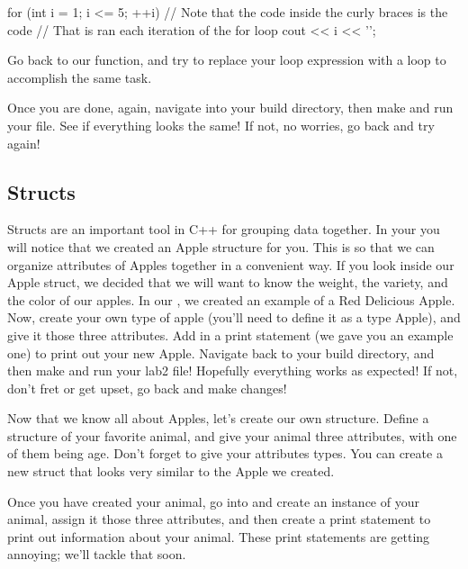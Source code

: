 \documentclass{tufte-handout}
\begin{document}
\begin{Code}
    for (int i = 1; i <= 5; ++i) {
        // Note that the code inside the curly braces is the code
        // That is ran each iteration of the for loop
        cout << i << '\n';
    }
\end{Code}

Go back to our  function, and try to replace your  loop expression with a  loop to accomplish the same task.

Once you are done, again, navigate into your build directory, then make and run your file.  See if everything looks the same!  If not, no worries, go back and try again!


\subsection{Structs}


Structs are an important tool in C++ for grouping data together.  In your  you will notice that we created an Apple structure for you.  This is so that we can organize attributes of Apples together in a convenient way.  If you look inside our Apple struct, we decided that we will want to know the weight, the variety, and the color of our apples.  In our , we created an example of a Red Delicious Apple.  Now, create your own type of apple (you'll need to define it as a type Apple), and give it those three attributes.  Add in a print statement (we gave you an example one) to print out your new Apple.  Navigate back to your build directory, and then make and run your lab2 file!  Hopefully everything works as expected!  If not, don't fret or get upset, go back and make changes!


Now that we know all about Apples, let's create our own structure.  Define a structure of your favorite animal, and give your animal three attributes, with one of them being age. Don't forget to give your attributes types. You can create a new struct that looks very similar to the Apple we created.

Once you have created your animal, go into  and create an instance of your animal, assign it those three attributes, and then create a print statement to print out information about your animal.  These print statements are getting annoying; we'll tackle that soon.
\end{document}
